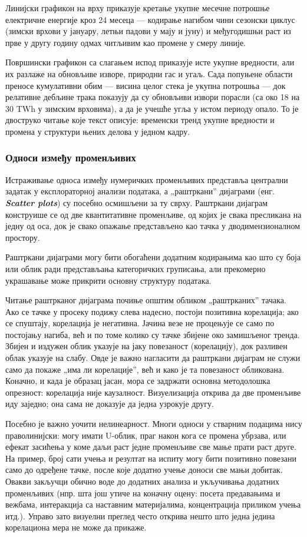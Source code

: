 Линијски графикон на врху приказује кретање укупне месечне потрошње електричне енергије кроз 24 месеца — кодирање нагибом чини сезонски циклус (зимски врхови у јануару, летњи падови у мају и јуну) и међугодишњи раст из прве у другу годину одмах читљивим као промене у смеру линије.

Површински графикон са слагањем испод приказује исте укупне вредности, али их разлаже на обновљиве изворе, природни гас и угаљ. Сада попуњене области преносе кумулативни обим — висина целог стека је укупна потрошња — док релативне дебљине трака показују да су обновљиви извори порасли (са око 18 на 30 TWh у зимским врховима), а да је учешће угља у истом периоду опало. То је двоструко читање које текст описује: временски тренд укупне вредности и промена у структури њених делова у једном кадру.

\subsubsection{Односи између променљивих}
Истраживање односа између нумеричких променљивих представља централни задатак у експлораторној анализи података, а „раштркани” дијаграми (енг. \textbf{\textit{Scatter plots}}) су посебно осмишљени за ту сврху. Раштркани дијаграм конструише се од две квантитативне променљиве, од којих је свака пресликана на једну од оса, док је свако опажање представљено као тачка у дводимензионалном простору.

Раштркани дијаграми могу бити обогаћени додатним кодирањима као што су боја или облик ради представљања категоричких груписања, али прекомерно украшавање може прикрити основну структуру података.

Читање раштрканог дијаграма почиње општим обликом „раштрканих” тачака. Ако се тачке у просеку подижу слева надесно, постоји позитивна корелација; ако се спуштају, корелација је негативна. Јачина везе не процењује се само по постојању нагиба, већ и по томе колико су тачке збијене око замишљеног тренда. Збијен и издужен облик указује на јаку повезаност (корелацију), док разливен облак указује на слабу. Овде је важно нагласити да раштркани дијаграм не служи само да покаже „има ли корелације”, већ и како је та повезаност обликована. Коначно, и када је образац јасан, мора се задржати основна методолошка опрезност: корелација није каузалност. Визуелизација открива да две променљиве иду заједно; она сама не доказује да једна узрокује другу.

Посебно је важно уочити нелинеарност. Многи односи у стварним подацима нису праволинијски: могу имати U-облик, праг након кога се промена убрзава, или ефекат засићења у коме даљи раст једне променљиве све мање прати раст друге. На пример, број сати учења и резултат на испиту могу бити позитивно повезани само до одређене тачке, после које додатно учење доноси све мањи добитак. Овакви закључци обично воде до додатних анализа и укључивања додатних променљивих (нпр. шта још утиче на коначну оцену: посета предавањима и вежбама, интеракција са наставним материјалима, концентрација приликом учења итд.). Управо зато визуелни преглед често открива нешто што једна једина корелациона мера не може да прикаже.

